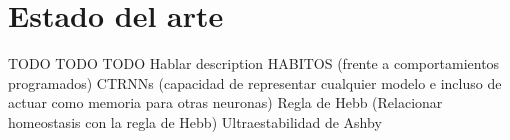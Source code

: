 \chapter{Estado del arte}
TODO TODO TODO Hablar description
HABITOS (frente a comportamientos programados)
CTRNNs (capacidad de representar cualquier modelo e incluso de actuar como memoria para otras neuronas)
Regla de Hebb (Relacionar homeostasis con la regla de Hebb)
Ultraestabilidad de Ashby
